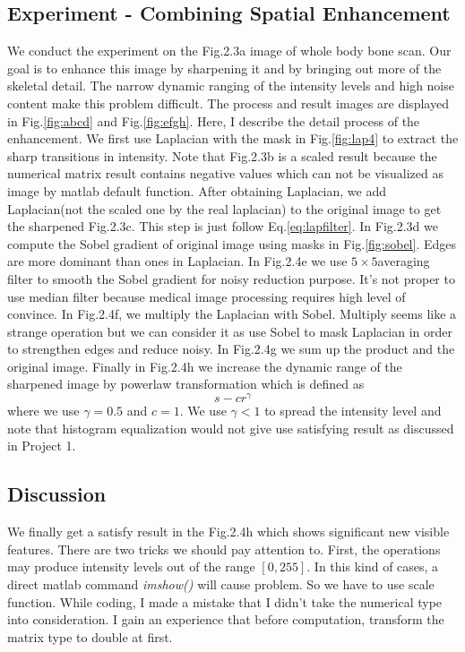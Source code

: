 \subsection{Experiment - Combining Spatial Enhancement}
We conduct the experiment on the Fig.2.3a image of whole body bone scan. Our goal is to enhance this image by sharpening it and by bringing out more of the skeletal detail. The narrow dynamic ranging of the intensity levels and high noise content make this problem difficult. The process and result images are displayed in Fig.\ref{fig:abcd} and Fig.\ref{fig:efgh}. Here, I describe the detail process of the enhancement. \newline
We first use Laplacian with the mask in Fig.\ref{fig:lap4} to extract the sharp transitions in intensity. Note that Fig.2.3b is a scaled result because the numerical matrix result contains negative values which can not be visualized as image by matlab default function. After obtaining Laplacian, we add Laplacian(not the scaled one by the real laplacian) to the original image to get the sharpened Fig.2.3c. This step is just follow Eq.\ref{eq:lapfilter}. In Fig.2.3d we compute the Sobel gradient of original image using masks in Fig.\ref{fig:sobel}. Edges are more dominant than ones in Laplacian. In Fig.2.4e we use $5 \times 5 $averaging filter to smooth the Sobel gradient for noisy reduction purpose. It’s not proper to use median filter because medical image processing requires high level of convince. In Fig.2.4f, we multiply the Laplacian with Sobel. Multiply seems like a strange operation but we can consider it as use Sobel to mask Laplacian in order to strengthen edges and reduce noisy. In Fig.2.4g we sum up the product and the original image. Finally in Fig.2.4h we increase the dynamic range of the sharpened image by powerlaw transformation which is defined as
\begin{equation} s-cr^\gamma \end{equation} where we use $\gamma=0.5$ and $c=1$. We use $\gamma <1$ to spread the intensity level and note that histogram equalization would not give use satisfying result as discussed in Project 1.

\subsection{Discussion}
We finally get a satisfy result in the Fig.2.4h which shows significant new visible features. There are two tricks we should pay attention to. First, the operations may produce intensity levels out of the range $[0,255]$. In this kind of cases, a direct matlab command \emph{imshow()} will cause problem. So we have to use scale function. While coding, I made a mistake that I didn’t take the numerical type into consideration. I gain an experience that before computation, transform the matrix type to double at first.

